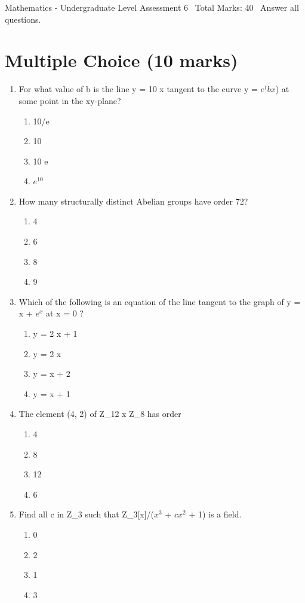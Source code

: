\documentclass[12pt]{article}
\begin{document}
\begin{center}
Mathematics - Undergraduate Level Assessment 6 \
Total Marks: 40 \
Answer all questions.
\end{center}

\section*{Multiple Choice (10 marks)}
\begin{enumerate}[label=\arabic*.]
\item For what value of b is the line y = 10 x tangent to the curve y = $e^(bx$) at some point in the xy-plane?
\begin{enumerate}[label=(\alph*)]
    \item 10/e
    \item 10
    \item 10 e
    \item $e^10$
\end{enumerate}
\item How many structurally distinct Abelian groups have order 72?
\begin{enumerate}[label=(\alph*)]
    \item 4
    \item 6
    \item 8
    \item 9
\end{enumerate}
\item Which of the following is an equation of the line tangent to the graph of y = x + $e^x$ at x = 0 ?
\begin{enumerate}[label=(\alph*)]
    \item y = 2 x + 1
    \item y = 2 x
    \item y = x + 2
    \item y = x + 1
\end{enumerate}
\item The element (4, 2) of Z\_12 x Z\_8 has order
\begin{enumerate}[label=(\alph*)]
    \item 4
    \item 8
    \item 12
    \item 6
\end{enumerate}
\item Find all c in Z\_3 such that Z\_3[x]/($x^3$ + $cx^2$ + 1) is a field.
\begin{enumerate}[label=(\alph*)]
    \item 0
    \item 2
    \item 1
    \item 3
\end{enumerate}
\end{enumerate}
\end{document}
